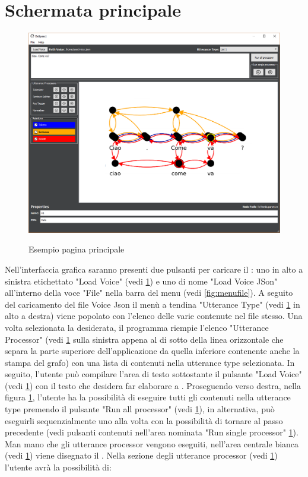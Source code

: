 \documentclass[../AnalisideiRequisiti.tex]{subfiles}
\begin{document}
	\section{Schermata principale}
		\begin{figure}[htp]
			\caption{Esempio pagina principale}
			\centering
			\includegraphics[width=\textwidth]{../img/paginainiziale.png}
			\label{fig:GUI}
		\end{figure}	
		Nell'interfaccia grafica saranno presenti due pulsanti per caricare il : uno in alto a sinistra etichettato "Load Voice" (vedi \ref{fig:GUI}) e uno di nome "Load Voice JSon" all'interno della voce "File" nella barra del menu (vedi \ref{fig:menufile}).
		 A seguito del caricamento del file Voice Json il menù a tendina "Utterance Type" (vedi \ref{fig:GUI} in alto a destra) viene popolato con l'elenco delle varie  contenute nel file stesso. 
		 Una volta selezionata la  desiderata, il programma riempie l'elenco "Utterance Processor" (vedi \ref{fig:GUI} sulla sinistra appena al di sotto della linea orizzontale che separa la parte superiore dell'applicazione da quella inferiore contenente anche la stampa del grafo) con una lista di  contenuti nella utterance type selezionata. 
		 In seguito, l'utente può compilare l'area di testo sottostante il pulsante "Load Voice" (vedi \ref{fig:GUI}) con il testo che desidera far elaborare a .
		 Proseguendo verso destra, nella figura \ref{fig:GUI}, l'utente ha la possibilità di eseguire tutti gli  contenuti nella utterance type premendo il pulsante "Run all processor" (vedi \ref{fig:GUI}), in alternativa, può eseguirli sequenzialmente uno alla volta con la possibilità di tornare al passo precedente (vedi pulsanti contenuti nell'area nominata "Run single processor" \ref{fig:GUI}).  Man mano che gli utterance processor vengono eseguiti, nell'area centrale bianca (vedi \ref{fig:GUI}) viene disegnato il . Nella sezione degli utterance processor (vedi \ref{fig:GUI}) l'utente avrà la possibilità di:
\end{document}
